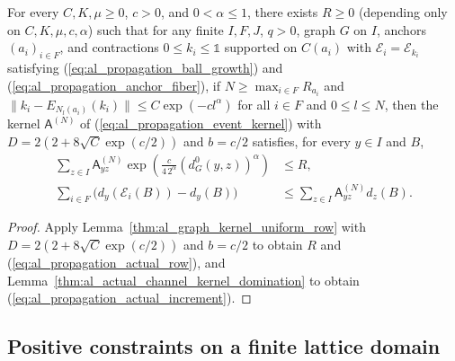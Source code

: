 \begin{lemma}
    \label{thm:al_actual_channel_uniform_bounds}
    \leanok
    For every $C,K,\mu\ge0$, $c>0$, and $0<\alpha\le1$, there exists $R\ge0$
    (depending only on $C,K,\mu,c,\alpha$) such that for any finite $I,F,J$,
    $q>0$, graph $G$ on $I$, anchors $(a_i)_{i\in F}$, and contractions
    $0\le k_i\le\mathbb 1$ supported on $C(a_i)$ with
    $\mathcal E_i=\mathcal E_{k_i}$ satisfying
    (\ref{eq:al_propagation_ball_growth}) and
    (\ref{eq:al_propagation_anchor_fiber}), if $N\ge\max_{i\in F}R_{a_i}$ and
    $\|k_i-E_{N_l(a_i)}(k_i)\|\le C\exp(-cl^\alpha)$ for all $i\in F$ and
    $0\le l\le N$, then the kernel $\mathsf A^{(N)}$ of
    (\ref{eq:al_propagation_event_kernel}) with
    $D=2(2+8\sqrt C\exp(c/2))$ and $b=c/2$ satisfies, for every $y\in I$ and
    $B$,
    \begin{align}
        \label{eq:al_propagation_actual_row}
        \sum_{z\in I}\mathsf A^{(N)}_{yz}
        \exp\left(\frac{c}{4\,2^\alpha}(d_G^0(y,z))^\alpha\right)
         & \le R,                                      \\
        \label{eq:al_propagation_actual_increment}
        \sum_{i\in F}\bigl(d_y(\mathcal E_i(B))-d_y(B)\bigr)
         & \le\sum_{z\in I}\mathsf A^{(N)}_{yz}d_z(B).
    \end{align}
\end{lemma}
\begin{proof}
    \leanok
    Apply Lemma~\ref{thm:al_graph_kernel_uniform_row} with
    $D=2(2+8\sqrt C\exp(c/2))$ and $b=c/2$ to obtain $R$ and
    (\ref{eq:al_propagation_actual_row}), and
    Lemma~\ref{thm:al_actual_channel_kernel_domination} to obtain
    (\ref{eq:al_propagation_actual_increment}).
\end{proof}

\subsection{Positive constraints on a finite lattice domain}


